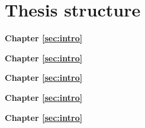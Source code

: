 \section{Thesis structure}
\label{sec:intro:structure}

\textbf{Chapter \ref{sec:intro}} \\[0.2em]
\blindtext

\textbf{Chapter \ref{sec:intro}} \\[0.2em]
\blindtext

\textbf{Chapter \ref{sec:intro}} \\[0.2em]
\blindtext

\textbf{Chapter \ref{sec:intro}} \\[0.2em]
\blindtext

\textbf{Chapter \ref{sec:intro}} \\[0.2em]
\blindtext
